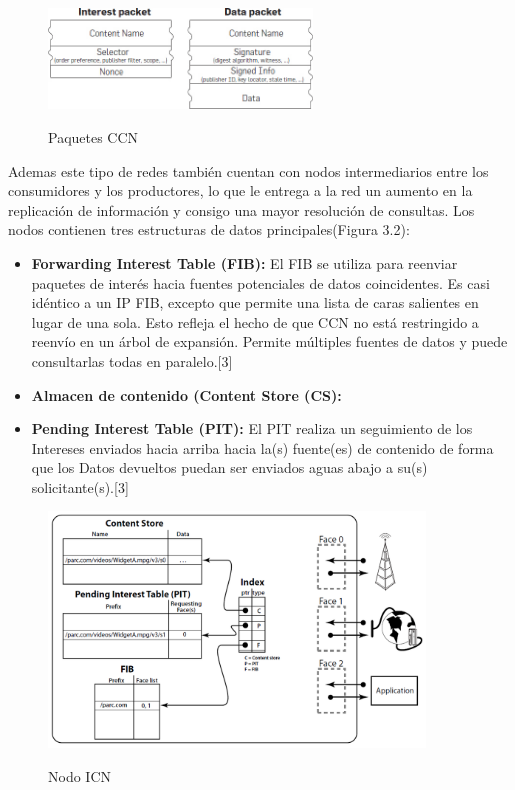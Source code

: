 \documentclass[12pt]{ociamthesis}  %
\begin{document}
	\begin{figure}[h]
		\centering
		\includegraphics[width=7cm]{Paquetes_CCN.jpg}\\
		\caption{Paquetes CCN}
		\label{fig:mesh1}
	\end{figure} 
Ademas este tipo de redes también cuentan con nodos intermediarios entre los consumidores y los productores, lo que le entrega a la red un aumento en la replicación de información y consigo una mayor resolución de consultas. Los nodos contienen tres estructuras de datos principales(Figura 3.2):\\

\begin{itemize}
	\item\textbf{Forwarding Interest Table (FIB):} El FIB se utiliza para reenviar paquetes de interés hacia fuentes potenciales de datos coincidentes. Es casi idéntico a un IP FIB, excepto que permite una lista de caras salientes en lugar de una sola. Esto refleja el hecho de que CCN no está restringido a reenvío en un árbol de expansión. Permite múltiples fuentes de datos y puede consultarlas todas en paralelo.[3]
	\item \textbf{Almacen de contenido (Content Store (CS):}
	\item \textbf{Pending Interest Table (PIT):} El PIT realiza un seguimiento de los Intereses enviados hacia arriba hacia la(s) fuente(es) de contenido de forma que los Datos devueltos puedan ser enviados aguas abajo a su(s) solicitante(s).[3]
\end{itemize}

	\begin{figure}[h]
		\centering
		\includegraphics[width=10cm]{Nodo.png}\\
		\caption{Nodo ICN}
		\label{fig:mesh1}
	\end{figure}
\end{document}
